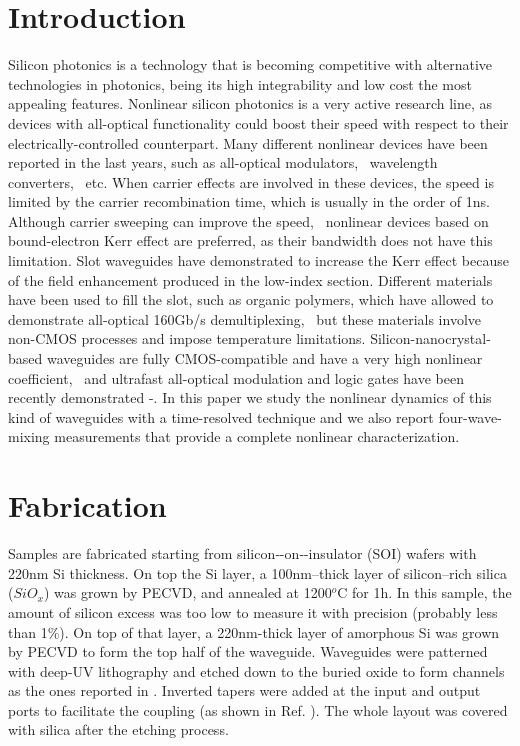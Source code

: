\documentclass[conference]{IEEEtran}
\begin{document}
\section{Introduction}
Silicon photonics is a technology that is becoming competitive with alternative technologies in photonics, being its high integrability and low cost the most appealing features. Nonlinear silicon photonics is a very active research line, as devices with all-optical functionality could boost their speed with respect to their electrically-controlled counterpart. Many different nonlinear devices have been reported in the last years, such as all-optical modulators,~\cite{Almeida2004a} wavelength converters,~\cite{Lee2009} etc. When carrier effects are involved in these devices, the speed is limited by the carrier recombination time, which is usually in the order of 1ns. Although carrier sweeping can improve the speed,~\cite{Turner-Foster2010} nonlinear devices based on bound-electron Kerr effect are preferred, as their bandwidth does not have this limitation. Slot waveguides have demonstrated to increase the Kerr effect because of the field enhancement produced in the low-index section. Different materials have been used to fill the slot, such as organic polymers, which have allowed to demonstrate all-optical 160Gb/s demultiplexing,~\cite{Koos2009} but these materials involve non-CMOS processes and impose temperature limitations. Silicon-nanocrystal-based waveguides are fully CMOS-compatible and have a very high nonlinear coefficient,~\cite{Spano2009} and ultrafast all-optical modulation and logic gates have been recently demonstrated \cite{Martinez2010a}-\cite{Otona}. In this paper we study the nonlinear dynamics of this kind of waveguides with a time-resolved technique and we also report four-wave-mixing measurements that provide a complete nonlinear characterization.

\section{Fabrication}
Samples are fabricated starting from silicon‑-on‑-insulator (SOI) wafers with 220nm Si thickness. On top the Si layer, a 100nm--thick layer of silicon--rich silica ($ SiO_x $) was grown by PECVD, and annealed at 1200$^o$C for 1h. In this sample, the amount of silicon excess was too low to measure it with precision (probably less than 1\%). On top of that layer, a 220nm-thick layer of amorphous Si was grown by PECVD to form the top half of the waveguide. Waveguides were patterned with deep-UV lithography and etched down to the buried oxide to form channels as the ones reported in \cite{Martinez2010a}. Inverted tapers were added at the input and output ports to facilitate the coupling (as shown in Ref. \cite{Bakir}). The whole layout was covered with silica after the etching process.  
\end{document}
